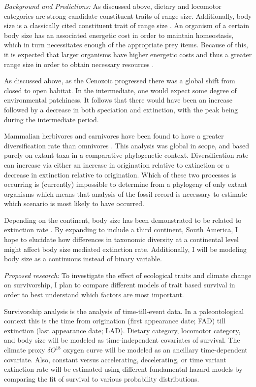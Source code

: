\documentclass[12pt,letterpaper]{article}
\begin{document}
\textit{Background and Predictions:} 
As discussed above, dietary and locomotor categories are strong candidate constituent traits of range size. Additionally, body size is a classically cited constituent trait of range size \citep{Smith2004,Smith2008b,Damuth1981a,Damuth1979}. An organism of a certain body size has an associated energetic cost in order to maintain homeostasis, which in turn necessitates enough of the appropriate prey items. Because of this, it is expected that larger organisms have higher energetic costs and thus a greater range size in order to obtain necessary resources \citep{Damuth1979,Brown1987,Damuth1979,Lyons2010}.

As discussed above, as the Cenozoic progressed there was a global shift from closed to open habitat. In the intermediate, one would expect some degree of environmental patchiness. It follows that there would have been an increase followed by a decrease in both speciation and extinction, with the peak being during the intermediate period.

Mammalian herbivores and carnivores have been found to have a greater diversification rate than omnivores \citep{Price2012}. This analysis was global in scope, and based purely on extant taxa in a comparative phylogenetic context. Diversification rate can increase via either an increase in origination relative to extinction or a decrease in extinction relative to origination. Which of these two processes is occurring is (currently) impossible to determine from a phylogeny of only extant organisms \citep{Rabosky2010a} which means that analysis of the fossil record is necessary to estimate which scenario is most likely to have occurred. 

Depending on the continent, body size has been demonstrated to be related to extinction rate \citep{Tomiya2013,Liow2008}. By expanding to include a third continent, South America, I hope to elucidate how differences in taxonomic diversity at a continental level might affect body size mediated extinction rate. Additionally, I will be modeling body size as a continuous instead of binary variable.

\textit{Proposed research:}
To investigate the effect of ecological traits and climate change on survivorship, I plan to compare different models of trait based survival in order to best understand which factors are most important.

Survivorship analysis is the analysis of time-till-event data. In a paleontological context this is the time from origination (first appearance date; FAD) till extinction (last appearance date; LAD). Dietary category, locomotor category, and body size will be modeled as time-independent covariates of survival. The climate proxy \(\delta O^{18}\) oxygen curve \citep{Zachos2008} will be modeled as an ancillary time-dependent covariate. Also, constant versus accelerating, decelerating, or time variant extinction rate will be estimated using different fundamental hazard models by comparing the fit of survival to various probability distributions.
\end{document}
